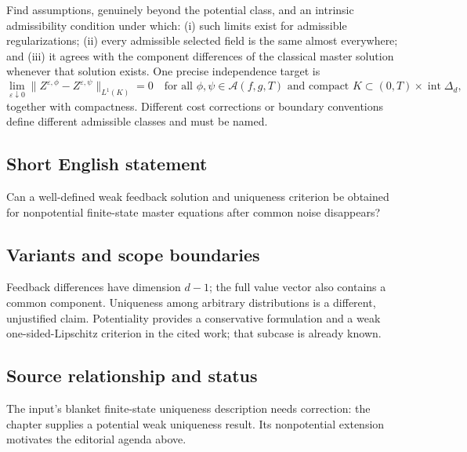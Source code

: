 \documentclass[11pt,a4paper]{article}
\begin{document}
Find assumptions, genuinely beyond the potential class, and an intrinsic admissibility condition under which: (i) such limits exist for admissible regularizations; (ii) every admissible selected field is the same almost everywhere; and (iii) it agrees with the component differences of the classical master solution whenever that solution exists. One precise independence target is
\[
 \lim_{\varepsilon\downarrow0}
 \|Z^{\varepsilon,\phi}-Z^{\varepsilon,\psi}\|_{L^1(K)}=0
 \quad\text{for all }\phi,\psi\in\mathcal A(f,g,T)
 \text{ and compact }K\subset(0,T)\times\operatorname{int}\Delta_d,
\]
together with compactness. Different cost corrections or boundary conventions define different admissible classes and must be named.
\subsection*{Short English statement}
Can a well-defined weak feedback solution and uniqueness criterion be obtained for nonpotential finite-state master equations after common noise disappears?
\subsection*{Variants and scope boundaries}
Feedback differences have dimension $d-1$; the full value vector also contains a common component. Uniqueness among arbitrary distributions is a different, unjustified claim. Potentiality provides a conservative formulation and a weak one-sided-Lipschitz criterion in the cited work; that subcase is already known.
\subsection*{Source relationship and status}
The input's blanket finite-state uniqueness description needs correction: the chapter supplies a potential weak uniqueness result. Its nonpotential extension motivates the editorial agenda above.
\end{document}
